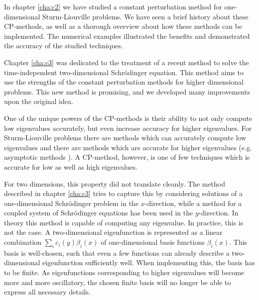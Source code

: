 

\label{cha:c4}

In chapter \ref{cha:c2} we have studied a constant perturbation method for one-dimensional Sturm-Liouville problems. We have seen a brief history about these CP-methods, as well as a thorough overview about how these methods can be implemented. The numerical examples illustrated the benefits and demonstrated the accuracy of the studied techniques.

Chapter \ref{cha:c3} was dedicated to the treatment of a recent method to solve the time-independent two-dimensional Schrödinger equation. This method aims to use the strengths of the constant perturbation methods for higher dimensional problems. This new method is promising, and we developed many improvements upon the original idea.

One of the unique powers of the CP-methods is their ability to not only compute low eigenvalues accurately, but even increase accuracy for higher eigenvalues. For Sturm-Liouville problems there are methods which can accurately compute low eigenvalues and there are methods which are accurate for higher eigenvalues (e.g. asymptotic methods \cite{kuzmina_asymptotic_2000,zhukova_asymptotic_2020}). A CP-method, however, is one of few techniques which is accurate for low as well as high eigenvalues.

For two dimensions, this property did not translate cleanly. The method described in chapter \ref{cha:c3} tries to capture this by considering solutions of a one-dimensional Schrödinger problem in the $x$-direction, while a method for a coupled system of Schrödinger equations has been used in the $y$-direction. In theory this method is capable of computing any eigenvalue. In practice, this is not the case. A two-dimensional eigenfunction is represented as a linear combination $\sum_{i} c_i(y) \beta_i(x)$ of one-dimensional basis functions $\beta_i(x)$. This basis is well-chosen, such that even a few functions can already describe a two-dimensional eigenfunction sufficiently well. When implementing this, the basis has to be finite. As eigenfunctions corresponding to higher eigenvalues will become more and more oscillatory, the chosen finite basis will no longer be able to express all necessary details.

